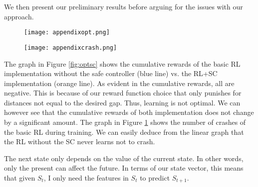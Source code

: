 \medskip

We then present our preliminary results before arguing for the issues with our approach. 

\begin{figure}[H]
  \centering
  \begin{minipage}{.5\textwidth}
    \centering
    \texttt{[image: appendixopt.png]}
    \label{fig:optsc}
  \end{minipage}%
  \begin{minipage}{.5\textwidth}
    \centering
    \texttt{[image: appendixcrash.png]}
    \label{fig:crashsc}
  \end{minipage}
\end{figure}
  
The graph in Figure \ref{fig:optsc} shows the cumulative rewards of the basic RL implementation without
the safe controller (blue line) vs. the RL+SC implementation (orange line). As evident in the cumulative rewards, all are negative. This is because of our reward function choice 
that only punishes for distances not equal to the desired gap. Thus, learning is not optimal. We can however see that the cumulative rewards of both implementation does not change by a significant 
amount. The graph in Figure \ref{fig:crashsc} shows 
the number of crashes of the basic RL during training. We can easily deduce from the linear graph that the RL without the SC never learns not to crash.


\begin{definition}
  The next state only depends on the value of the current state. In other words, only the present can affect the future. 
  In terms of our state vector, this means that given $S_t$, I only need the features in $S_t$ to predict $S_{t+1}$.
\end{definition}

